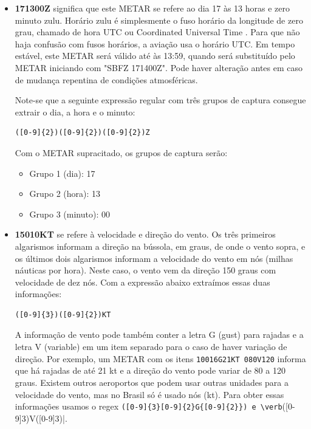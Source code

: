 \begin{itemize}
\item \textbf{171300Z} significa que este METAR se refere ao dia 17 às 13 horas e zero 
minuto zulu. Horário zulu é simplesmente o fuso horário da longitude de zero grau, 
chamado de hora UTC ou Coordinated Universal Time \cite{UTC}. Para que não haja 
confusão com fusos horários, a aviação usa o horário UTC. Em tempo
estável, este 
METAR será válido até às 13:59, quando será substituído pelo METAR iniciando com 
"SBFZ 171400Z". Pode haver alteração antes em caso de mudança repentina de condições 
atmosféricas.

Note-se que a seguinte expressão regular com três grupos de captura consegue extrair 
o dia, a hora e o minuto:

\begin{verbatim}
([0-9]{2})([0-9]{2})([0-9]{2})Z
\end{verbatim}

Com o METAR supracitado, os grupos de captura serão:

\begin{itemize}
\item Grupo 1 (dia): 17
\item Grupo 2 (hora): 13
\item Grupo 3 (minuto): 00
\end{itemize}

\item \textbf{15010KT} se refere à velocidade e direção do vento. Os três primeiros 
algarismos informam a direção na bússola, em graus, de onde o vento sopra, e os 
últimos dois algarismos informam a velocidade do vento em nós (milhas náuticas por hora). 
Neste caso, o vento vem da direção 150 graus com velocidade de dez nós. Com a 
expressão abaixo extraímos essas duas informações:

\begin{verbatim}
([0-9]{3})([0-9]{2})KT
\end{verbatim}

A informação de vento pode também conter a letra G (gust) para rajadas e a letra 
V (variable) em um item separado para o caso de haver variação de direção. Por 
exemplo, um METAR com os itens \texttt{10016G21KT 080V120} informa que há rajadas 
de até 21 kt e a direção do vento pode variar de 80 a 120 graus. Existem outros 
aeroportos que podem usar outras unidades para a velocidade do vento, mas no 
Brasil só é usado nós (kt). Para obter essas informações usamos o regex 
\verb|([0-9]{3}[0-9]{2}G{[0-9]{2}}) e \verb|([0-9]{3})V([0-9]{3})|.


\end{itemize}
